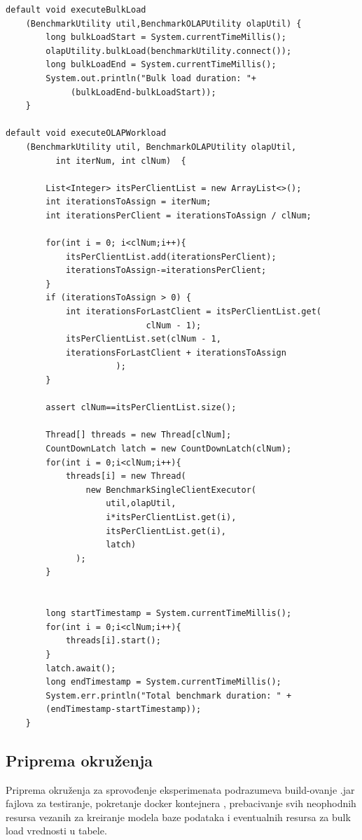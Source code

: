\documentclass[12pt,oneside]{memoir}
\begin{document}
\begin{lstlisting}[title={OLAPBenchmarkExecutor.java},captionpos=t]
default void executeBulkLoad
	(BenchmarkUtility util,BenchmarkOLAPUtility olapUtil) {
        long bulkLoadStart = System.currentTimeMillis();
        olapUtility.bulkLoad(benchmarkUtility.connect());
        long bulkLoadEnd = System.currentTimeMillis();
        System.out.println("Bulk load duration: "+
       	 	 (bulkLoadEnd-bulkLoadStart));
    }

default void executeOLAPWorkload
    (BenchmarkUtility util, BenchmarkOLAPUtility olapUtil, 
          int iterNum, int clNum)  {

        List<Integer> itsPerClientList = new ArrayList<>();
        int iterationsToAssign = iterNum;
        int iterationsPerClient = iterationsToAssign / clNum;

        for(int i = 0; i<clNum;i++){
            itsPerClientList.add(iterationsPerClient);
            iterationsToAssign-=iterationsPerClient;
        }
        if (iterationsToAssign > 0) {
            int iterationsForLastClient = itsPerClientList.get(
							clNum - 1);
            itsPerClientList.set(clNum - 1, 
			iterationsForLastClient + iterationsToAssign
					  );
        }

        assert clNum==itsPerClientList.size();

        Thread[] threads = new Thread[clNum];
        CountDownLatch latch = new CountDownLatch(clNum);
        for(int i = 0;i<clNum;i++){
            threads[i] = new Thread(
				new BenchmarkSingleClientExecutor(
					util,olapUtil,
					i*itsPerClientList.get(i),
					itsPerClientList.get(i),
					latch)
			  );
        }


        long startTimestamp = System.currentTimeMillis();
        for(int i = 0;i<clNum;i++){
            threads[i].start();
        }
        latch.await();
        long endTimestamp = System.currentTimeMillis();
        System.err.println("Total benchmark duration: " + 
		(endTimestamp-startTimestamp));
    }
\end{lstlisting}

\subsection{Priprema okruženja}

Priprema okruženja za sprovođenje eksperimenata podrazumeva build-ovanje  .jar fajlova za testiranje, pokretanje docker kontejnera , prebacivanje svih neophodnih resursa vezanih za kreiranje modela baze podataka i eventualnih resursa za bulk load vrednosti u tabele.
\end{document}
